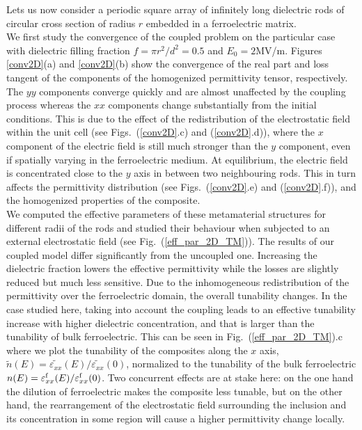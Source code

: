 \documentclass[%
 aip,
 amsmath,amssymb,
 reprint,%
linenumbers
]{revtex4-1}
\newcommand{\epsf}{\varepsilon^{\rm f}}
\newcommand{\fig}[1]{Fig.~(\ref{#1})}
\newcommand{\co}[1]{\textcolor{correction}{#1}}
\begin{document}
Lets us now consider a periodic square array of infinitely long dielectric rods of circular cross section
of radius $r$ embedded in a ferroelectric matrix.\\
We first study the convergence of the coupled problem on the particular case with dielectric
filling fraction $f=\pi r^2/d^2=0.5$ and $E_0=2$MV/m. Figures \ref{conv2D}(a) and \ref{conv2D}(b) show the
convergence of the real part and loss tangent of the components of the homogenized
permittivity tensor, respectively. The $yy$ components converge quickly
and are almost unaffected by the coupling process whereas the
$xx$ components change substantially from the initial conditions.
This is due to the effect of the redistribution
of the electrostatic field within the unit cell (see Figs.~(\ref{conv2D}.c) and (\ref{conv2D}.d)),
where the $x$ component of the electric field is still much stronger
than the $y$ component, even if spatially varying in the ferroelectric medium.
At equilibrium, the electric field is concentrated close to the $y$ axis in between two neighbouring
rods. This in turn affects the permittivity distribution (see Figs.~(\ref{conv2D}.e) and (\ref{conv2D}.f)),
and the homogenized properties of the composite.\\
We computed the effective parameters of these metamaterial structures for different
radii of the rods and studied their behaviour when subjected to an external
electrostatic field (see \fig{eff_par_2D_TM}). The results of our coupled
model differ significantly from the uncoupled one. Increasing the dielectric fraction
lowers the effective permittivity while the losses are slightly reduced but much less sensitive.
Due to the inhomogeneous redistribution of the permittivity over the ferroelectric domain, the
overall tunability changes. In the case studied here, taking into account
the coupling leads to an effective tunability increase with
higher dielectric concentration, and that is larger than the tunability
 of bulk ferroelectric. \co{This can be seen in \fig{eff_par_2D_TM}.c where we plot the tunability of the composites
 along the $x$ axis, $\tilde{n}(E) = \tilde{\varepsilon_{xx}}(E) / \tilde{\varepsilon_{xx}}(0)$, normalized to the tunability of the bulk ferroelectric $n(E) = \epsf_{xx}(E) / \epsf_{xx}(0)$.}
 Two concurrent effects are at stake here: on the one hand
the dilution of ferroelectric makes the composite less tunable, but on the other hand,
the rearrangement of the electrostatic field surrounding the inclusion and its
concentration in some region will cause a higher permittivity change locally.
\end{document}
